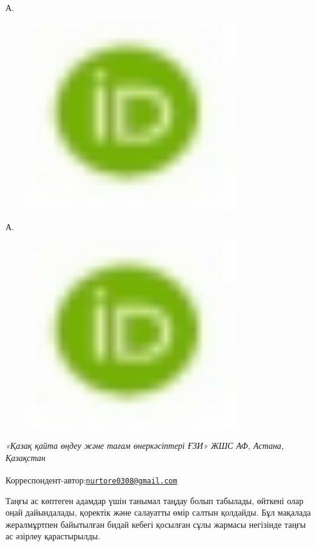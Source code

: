 А.
\begin{figure}[H]
	\centering
	\includegraphics[width=0.8\textwidth]{media/pish2/image2}
	\caption*{}
\end{figure}

А.
\begin{figure}[H]
	\centering
	\includegraphics[width=0.8\textwidth]{media/pish2/image2}
	\caption*{}
\end{figure}


\emph{«Қазақ қайта өңдеу және тағам өнеркәсіптері ҒЗИ» ЖШС АФ, Астана,
Қазақстан}

{\bfseries \textsuperscript{\envelope }}Корреспондент-автор:\href{mailto:nurtore0308@gmail.com}{\nolinkurl{nurtore0308@gmail.com}}

Таңғы ас көптеген адамдар үшін танымал таңдау болып табылады, өйткені
олар оңай дайындалады, қоректік және салауатты өмір салтын қолдайды. Бұл
мақалада жералмұртпен байытылған бидай кебегі қосылған сұлы жармасы
негізінде таңғы ас әзірлеу қарастырылды.

